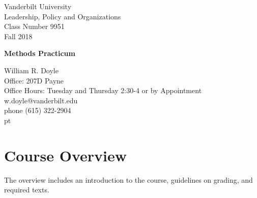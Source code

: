 \documentclass[12pt]{article}
\begin{document}


\thispagestyle{empty}%


\setlength{\parskip}{1ex plus 0.5ex minus 0.2ex}

\setcounter{secnumdepth}{-2}



\begin{flushleft}
Vanderbilt University\\
Leadership, Policy and Organizations\\
Class Number 9951\\ 
Fall 2018\\
\end{flushleft}

\begin{center}
\Large{\textbf{Methods Practicum}}\\
\end{center}

\begin{flushleft}
William R. Doyle\\
Office: 207D Payne\\
Office Hours: Tuesday and Thursday 2:30-4 or by Appointment \\
w.doyle@vanderbilt.edu\\
phone (615) 322-2904\\

 pt

\end{flushleft}

\section{Course Overview}%

The overview includes an introduction to the course, guidelines on grading, and required texts.
\end{document}
